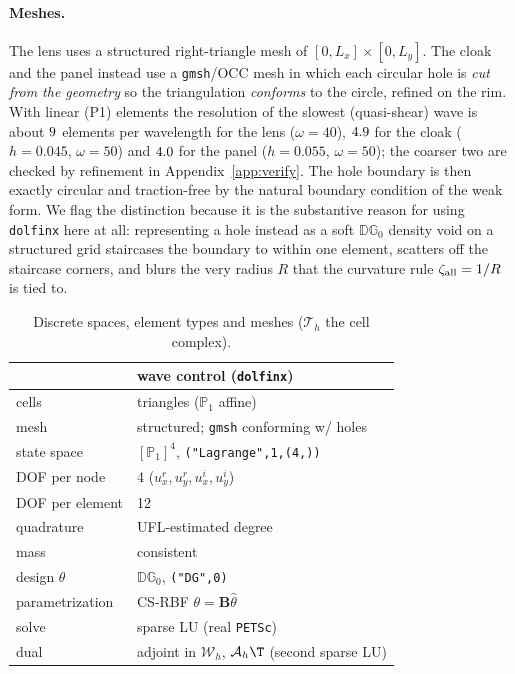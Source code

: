 \paragraph{Meshes.} The lens uses a structured right-triangle mesh of
$[0,L_x]\times[0,L_y]$. The cloak and the
panel instead use a
\texttt{gmsh}/OCC mesh in which each circular hole is \emph{cut from the geometry}
so the triangulation \emph{conforms} to the circle, refined on the rim. With linear (P1)
elements the resolution of the slowest (quasi-shear) wave is about $9$ elements per
wavelength for the lens ($\omega=40$), $4.9$ for the cloak ($h=0.045$, $\omega=50$) and
$4.0$ for the panel ($h=0.055$, $\omega=50$); the coarser two are checked by refinement
in Appendix~\ref{app:verify}. The hole boundary is then exactly
circular and traction-free by the natural boundary condition of the weak form. We
flag the distinction because it is the substantive reason for using
\texttt{dolfinx} here at all: representing a hole instead as a soft
$\mathbb{DG}_0$ density void on a structured grid staircases the boundary to
within one element, scatters off the staircase corners, and blurs the very radius
$R$ that the curvature rule $\zeta_{\rm all}=1/R$ is tied to.

\begin{table}[!tbp]
\centering\small
\caption{Discrete spaces, element types and meshes ($\mathcal T_h$ the cell complex).}
\label{tab:spaces}
\begin{tabular}{ll}
\toprule
& wave control (\texttt{dolfinx})\\
\midrule
cells & triangles ($\mathbb P_1$ affine)\\
mesh & structured; \texttt{gmsh} conforming w/ holes\\
state space & $[\mathbb P_1]^4$, \texttt{("Lagrange",1,(4,))}\\
DOF per node & 4 ($u^r_x,u^r_y,u^i_x,u^i_y$)\\
DOF per element & 12\\
quadrature & UFL-estimated degree\\
mass & consistent\\
design $\theta$ & $\mathbb{DG}_0$, \texttt{("DG",0)}\\
parametrization & CS-RBF $\theta=\mathbf B\hat\theta$\\
solve & sparse LU (real \texttt{PETSc})\\
dual & adjoint in $\mathcal W_h$, $\mathcal A_h\T$ (second sparse LU)\\
\bottomrule
\end{tabular}
\end{table}

